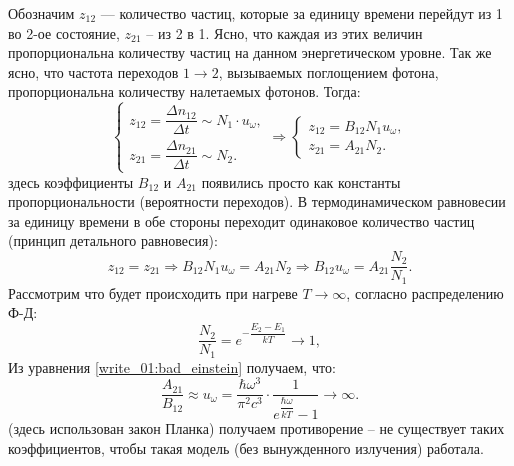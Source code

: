 Обозначим $z_{12}$ --- количество частиц, которые за единицу времени перейдут из 1 во
2-ое состояние, $z_{21}$ -- из 2 в 1. Ясно, что каждая из этих величин пропорциональна количеству
частиц на данном энергетическом уровне. Так же ясно, что частота переходов $1\to 2$, вызываемых
поглощением фотона, пропорциональна количеству налетаемых фотонов. Тогда:
\[
  \begin{cases}
    z_{12} = \dfrac{\Delta n_{12}}{\Delta t} \sim N_1 \cdot u_\omega, \\[10pt]
    z_{21} = \dfrac{\Delta n_{21}}{\Delta t} \sim N_2. 
  \end{cases}
  \Rightarrow
  \begin{cases}
    z_{12} = B_{12} N_1 u_\omega, \\
    z_{21} = A_{21} N_2.
  \end{cases}
\]
здесь коэффициенты $B_{12}$ и $A_{21}$ появились просто как константы
пропорциональности (вероятности переходов).
В термодинамическом равновесии за единицу времени в обе стороны переходит одинаковое количество 
частиц (принцип детального равновесия):
\begin{equation}\label{write_01:bad_einstein}
  z_{12} = z_{21} \Rightarrow
  B_{12} N_1 u_\omega = A_{21} N_2
  \Rightarrow
  B_{12} u_\omega = A_{21} \dfrac{N_2}{N_1}.
\end{equation}
Рассмотрим что будет происходить при нагреве $T \to \infty$, согласно распределению Ф-Д:
\[
  \dfrac{N_2}{N_1} = e^{- \dfrac{E_2-E_1}{kT}} \to 1,
\]
Из уравнения \eqref{write_01:bad_einstein} получаем, что:
\[
  \dfrac{A_{21}}{B_{12}}
  \approx u_\omega
  = \dfrac{\hbar \omega^3}{\pi^2 c^3} \cdot \dfrac{1}{e^{\dfrac{\hbar \omega}{kT}} - 1} \to \infty.
\]
(здесь использован закон Планка) получаем противорение -- не существует таких коэффициентов, чтобы
такая модель (без вынужденного излучения) работала.


